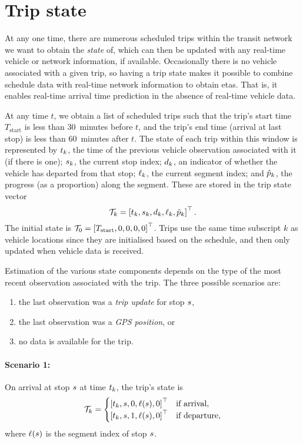 \section{Trip state}
\label{sec:trip_state}

At any one time, there are numerous scheduled trips within the transit network we want to obtain the \emph{state} of, which can then be updated with any real-time vehicle or network information, if available. Occasionally there is no vehicle associated with a given trip, so having a trip state makes it possible to combine schedule data with real-time network information to obtain \glspl{eta}. That is, it enables real-time arrival time prediction in the absence of real-time vehicle data.


At any time $t$, we obtain a list of scheduled trips such that the trip's start time $T_\text{start}$ is less than 30~minutes before $t$, and the trip's end time (arrival at last stop) is less than 60~minutes after $t$. The state of each trip within this window is represented by $t_k$, the time of the previous vehicle observation associated with it (if there is one); $s_k$, the current stop index; $d_k$, an indicator of whether the vehicle has departed from that stop; $\ell_k$, the current segment index; and $\hat p_k$, the progress (as a proportion) along the segment. These are stored in the trip state vector
\begin{equation}
\label{eq:trip_state}
\mathcal{T}_k = \left[t_k, s_k, d_k, \ell_k, \hat p_k\right]^\top.
\end{equation}
The initial state is $\mathcal{T}_0 = \left[T_\text{start},0,0,0,0\right]^\top$. Trips use the same time subscript $k$ as vehicle locations since they are initialised based on the schedule, and then only updated when vehicle data is received.

Estimation of the various state components depends on the type of the most recent observation associated with the trip. The three possible scenarios are:
\begin{enumerate}
\item the last observation was a \emph{trip update} for stop $s$,
\item the last observation was a \emph{GPS position}, or
\item no data is available for the trip.
\end{enumerate}


\paragraph{Scenario 1:}
On arrival at stop $s$ at time $t_k$, the trip's state is
\begin{equation}
\label{eq:trip_state_tu}
\mathcal{T}_k =
\begin{cases}
\left[t_k, s, 0, \ell(s), 0\right]^\top & \text{if arrival}, \\
\left[t_k, s, 1, \ell(s), 0\right]^\top & \text{if departure},
\end{cases}
\end{equation}
where $\ell(s)$ is the segment index of stop $s$.


